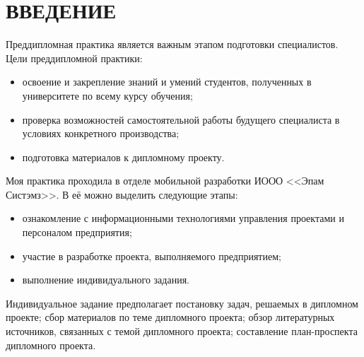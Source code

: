 \section*{ВВЕДЕНИЕ}

Преддипломная практика является важным этапом подготовки специалистов.
Цели преддипломной практики:
\begin{itemize}
\item освоение и закрепление знаний и умений студентов,
  полученных в университете по всему курсу обучения;
\item проверка возможностей самостоятельной работы будущего специалиста
  в условиях конкретного производства;
\item подготовка материалов к дипломному проекту.
\end{itemize}

Моя практика проходила в отделе мобильной разработки
ИООО <<Эпам Систэмз>>.
В её можно выделить следующие этапы:
\begin{itemize}
\item ознакомление с информационными технологиями управления
  проектами и персоналом предприятия;
\item участие в разработке проекта, выполняемого предприятием;
\item выполнение индивидуального задания.
\end{itemize}

Индивидуальное задание предполагает
постановку задач, решаемых в дипломном проекте;
сбор материалов по теме дипломного проекта;
обзор литературных источников, связанных с темой дипломного проекта;
составление план-проспекта дипломного проекта.